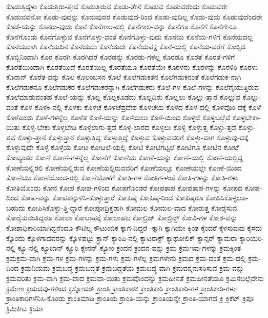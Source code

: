 {ಕೊಡುತ್ತಿದ್ದಳು
ಕೊಡುತ್ತಿರು-ತ್ತೇವೆ
ಕೊಡುತ್ತಿರುವ
ಕೊಡು-ತ್ತೇನೆ
ಕೊಡುವ
ಕೊಡುವರೆಂದು
ಕೊಡುವರೇ
ಕೊಡುವವನೋ
ಕೊಡು-ವುದನ್ನು
ಕೊಡುವುದರ
ಕೊಡುವುದ-ರಿಂದ
ಕೊಡು-ವುದಿಲ್ಲ
ಕೊಡು-ವುದು
ಕೊಡುವುದೆಂದರೇ
ಕೊಡೆ-ಯನ್ನು
ಕೊನರು-ವುದು
ಕೊನೆ
ಕೊನೆಗಾಲ-ದಲ್ಲಿ
ಕೊನೆಗಾಲ-ವನ್ನು
ಕೊನೆಗೂ
ಕೊನೆಗೆ
ಕೊನೆಗೇನೂ
ಕೊನೆಗೊಂಡು
ಕೊನೆಗೊಳ್ಳುವ
ಕೊನೆಗೊಳ್ಳು-ವಂತೆ
ಕೊನೆಗೊಳ್ಳು-ವುದು
ಕೊನೆಯ
ಕೊನೆಯ-ಗಳಿಗೆ
ಕೊನೆಯದಲ್ಲ
ಕೊನೆಯದಾಗಿ
ಕೊನೆಯದಿನ
ಕೊನೆಯದು
ಕೊನೆಯದೇ
ಕೊನೆಯಪಕ್ಷ
ಕೊನೆ-ಯಲ್ಲಿ
ಕೊನೆಯ-ವರೆಗೆ
ಕೊಬ್ಬಿದ
ಕೊಬ್ಬಿನಿಂದಾಗಿ
ಕೊರ
ಕೊರಗಿ
ಕೊರಗಿದರೆ
ಕೊರಡನ್ನು
ಕೊರಡು-ಗಳಲ್ಲ
ಕೊರಡೂ
ಕೊರತೆ
ಕೊರತೆ-ಗಳಿಗೆ
ಕೊರತೆಯಿಂದಾಗಿ
ಕೊರತೆಯಿದೆ
ಕೊರತೆಯಿಲ್ಲ
ಕೊರತೆಯೂ
ಕೊರತೆಯೇ
ಕೊರಳನು
ಕೊರಳನ್ನು
ಕೊರಳಿರಿ
ಕೊರಳು
ಕೊರಾನ್
ಕೊರೆತ-ವನ್ನು
ಕೊಲ
ಕೊಲಂಬಸನ
ಕೊಲೆ
ಕೊಲೆಗಡುಕತನ
ಕೊಲೆಗಡುಕನಂತೆ
ಕೊಲೆಗಡುಕ-ನಾಗಿ
ಕೊಲೆಗಡುಕನೂ
ಕೊಲೆಗಡುಕರ
ಕೊಲೆಗಡುಕರನ್ನಾಗಿ
ಕೊಲೆಗಡುಕರು
ಕೊಲೆ-ಗಳ
ಕೊಲೆ-ಗಳನ್ನು
ಕೊಲೆಗೈಯುತ್ತಿರುವ
ಕೊಲೆಮಾಡುವಂತಹ
ಕೊಲೆ-ಯನ್ನು
ಕೊಲ್ಲ
ಕೊಲ್ಲಕೂಡದು
ಕೊಲ್ಲದಿರು
ಕೊಲ್ಲಲು
ಕೊಲ್ಲು-ತ್ತಾನೆ
ಕೊಲ್ಲುವ
ಕೊಲ್ಲು-ವಂತೆ
ಕೊಳ
ಕೊಳಕಿ-ನಲ್ಲಿ
ಕೊಳಕು
ಕೊಳಚೆ
ಕೊಳಚೆಪ್ರದೇಶ
ಕೊಳಚೆಯ
ಕೊಳದ
ಕೊಳ-ದಲ್ಲಿ
ಕೊಳವೊಂ-ದಕ್ಕೆ
ಕೊಳೆ
ಕೊಳೆಎಂದು
ಕೊಳೆ-ಗಳನ್ನೆಲ್ಲ
ಕೊಳೆತ
ಕೊಳೆ-ಯನ್ನು
ಕೊಳೆಯಲು
ಕೊಳೆ-ಯಿಂದ
ಕೊಳ್ಳದೆ
ಕೊಳ್ಳಬಲ್ಲೆವೆ
ಕೊಳ್ಳಬೇಕಾ-ಯಿತು
ಕೊಳ್ಳ-ಬೇಕು
ಕೊಳ್ಳಬೇಡಿ
ಕೊಳ್ಳಲಾಗು-ತ್ತದೆ
ಕೊಳ್ಳ-ಲಾರದ
ಕೊಳ್ಳಲು
ಕೊಳ್ಳಿ
ಕೊಳ್ಳುತ್ತ
ಕೊಳ್ಳು-ತ್ತದೆ
ಕೊಳ್ಳು-ತ್ತವೆ
ಕೊಳ್ಳು-ತ್ತಾನೆ
ಕೊಳ್ಳುತ್ತಾರೆ
ಕೊಳ್ಳುತ್ತಿದ್ದ
ಕೊಳ್ಳುತ್ತಿದ್ದೆ
ಕೊಳ್ಳುವ
ಕೊಳ್ಳುವವರಿಗೆ
ಕೊಳ್ಳು-ವಾಗ
ಕೊಳ್ಳುವು-ದಕ್ಕೆ
ಕೊಳ್ಳುವುದೇ
ಕೊಳ್ಳೆ
ಕೊಳ್ಳೆಯ
ಕೋಟ
ಕೋಟಲೆ-ಯಲ್ಲಿ
ಕೋಟಿ
ಕೋಟಿಗಟ್ಟಲೆ
ಕೋಟಿಗೂ
ಕೋಟಿನ
ಕೋಟೆ
ಕೋಟ್ಯಂತರ
ಕೋಣೆ
ಕೋಣೆ-ಗಳನ್ನೆಲ್ಲ
ಕೋಣೆಗೆ
ಕೋಣೆಯ
ಕೋಣೆ-ಯನ್ನು
ಕೋಣೆ-ಯಲ್ಲಿ
ಕೋಣೆ-ಯಲ್ಲಿದ್ದ
ಕೋಣೆಯಲ್ಲಿರಲಿ
ಕೋಣೆಯಲ್ಲಿರುವ
ಕೋಣೆಯಲ್ಲಿರುವವರಿಗೆ
ಕೋಣೆಯಲ್ಲೂ
ಕೋಣೆಯಲ್ಲೇ
ಕೋಣೆ-ಯಿಂದ
ಕೋಣೆಯು
ಕೋಣೆಯೊಂದ-ರಲ್ಲಿ
ಕೋಣೆಯೊಳಗೆ
ಕೋತಿ-ಗಳ
ಕೋತಿಗ-ಳಂತೆ
ಕೋತಿ-ಗಳನ್ನು
ಕೋತಿ-ಗಳು
ಕೋತಿಯೊಂದು
ಕೋನ
ಕೋಪ
ಕೋಪ-ಗಳಿಂದ
ಕೋಪಗೊಂಡರೆ
ಕೋಪತಾಪ
ಕೋಪತಾಪ-ಗಳನ್ನು
ಕೋಪದ
ಕೋಪ-ದಿಂದ
ಕೋಪ-ವನ್ನು
ಕೋಪವನ್ನುಳಿಸಿ-ಕೊಳ್ಳುತ್ತಾರೆ
ಕೋಪಿಷ್ಠ
ಕೋಪಿಷ್ಠ-ರಿಂದ
ಕೋಪಿಷ್ಠರೂ
ಕೋಪಿಸಿಕೊಳ್ಳಲೂ-ಬಹುದು
ಕೋಪಿಸಿಕೊಳ್ಳು-ತ್ತಿ-ದ್ದಾರೆ
ಕೋಪೋದ್ರಿಕ್ತರಾಗಿ
ಕೋಮಲ
ಕೋಮಲ-ವಾದ
ಕೋರುತ್ತ
ಕೋರೈಸುವ
ಕೋರೈಸುವಂತಿದ್ದರೂ
ಕೋಲಾ
ಕೋಲಾಹಕ್ಕೆ
ಕೋಲಾಹಲ
ಕೋಲ್ರಿಜ್
ಕೋಲ್ರಿಡ್ಜ್
ಕೋವಿ-ಗಳ
ಕೋಶ-ವನ್ನು
ಕೋಶಾಧಿಕಾರಿಯಾಗಿದ್ದನೆಂದೂ
ಕೌಟಿಲ್ಯ
ಕೌಟುಂಬಿಕ
ಕ್ಕಾಗ-ದಿದ್ದರೆ
-ಕ್ಕಾಗಿ
ಕ್ಕಾಗಿಯೇ
ಕ್ಕಿಂತ
ಕ್ಕೆಂದರೆ
ಕ್ಕೆಳಸುವುವು
ಕ್ಕೆಸೆದು
ಕ್ಕೊಂದು
ಕ್ಕೊಳಗಾದವರನ್ನು
ಕ್ಕೊಳಪಟ್ಟು
ಕ್ಟ್ರಾನ್
ಕ್ಯಾಂಪಿ-ನಲ್ಲಿ
ಕ್ಯಾಟರಾಕ್ಟ್
ಕ್ಯಾಥೋಲಿಕ್
ಕ್ಯಾನ್ಸರ್
ಕ್ಯಾಮರಾ
ಕ್ಯಾರಿಯರಿ-ನಲ್ಲಿ
ಕ್ಯೂ-ನಲ್ಲಿ
ಕ್ಯೂಬಾನ್
ಕ್ಯೂರಿ
ಕ್ಯೇನನ್
ಕ್ಯೋಂ
ಕ್ರಂದನ
ಕ್ರಂದನ-ವನ್ನು
ಕ್ರಮ
ಕ್ರಮಇವು-ಗಳನ್ನು
ಕ್ರಮಕ್ಕಿಂತ
ಕ್ರಮಕ್ರಮ-ವಾಗಿ
ಕ್ರಮ-ಗಳ
ಕ್ರಮ-ಗಳನ್ನು
ಕ್ರಮ-ಗಳು
ಕ್ರಮ-ಗಳೆಲ್ಲ
ಕ್ರಮಗಳೇನು
ಕ್ರಮದ
ಕ್ರಮ-ದಂತೆ
ಕ್ರಮ-ದಲ್ಲಿ
ಕ್ರಮ-ದಿಂದ
ಕ್ರಮನಿಯಮ
ಕ್ರಮಬದ್ಧ
ಕ್ರಮಬದ್ಧತೆ
ಕ್ರಮಬದ್ಧತೆಯ
ಕ್ರಮಬದ್ಧ-ವಾಗಿ
ಕ್ರಮವನ್ನನುಸರಿಸುವ
ಕ್ರಮ-ವನ್ನು
ಕ್ರಮವರಿತು
ಕ್ರಮ-ವಾಗಿ
ಕ್ರಮ-ವಾದ
ಕ್ರಮವಾ-ಯಿತು
ಕ್ರಮವೊಂದನ್ನು
ಕ್ರಮಹೀನತೆ
ಕ್ರಮಹೀನತೆಯೂ
ಕ್ರಮಿಸಬಲ್ಲೆವೇನು
ಕ್ರಮೇಣ
ಕ್ರಯದವು-ಗಳಿಂದ
ಕ್ರಸ್ನೋದರ್
ಕ್ರಾಂತಿ
ಕ್ರಾಂತಿಕಾರಕ
ಕ್ರಾಂತಿಕಾರಿ
ಕ್ರಾಂತಿಕಾರಿ-ಗಳ
ಕ್ರಾಂತಿಕಾರಿ-ಗಳು
ಕ್ರಾಂತಿಕಾರಿಗಳೆನಿಸಿ-ಕೊಂಡು
ಕ್ರಾಂತಿಮಾಡಿ
ಕ್ರಾಂತಿಯ
ಕ್ರಾಂತಿ-ಯನ್ನು
ಕ್ರಾಂತಿಯನ್ನೇ
ಕ್ರಾಂತಿ-ಯಾಗದೆ
ಕ್ರಿ
ಕ್ರಿಕೆಟ್
ಕ್ರಿಪೂ
ಕ್ರಿಮಿಕೀಟ
ಕ್ರಿಯಾ
}
